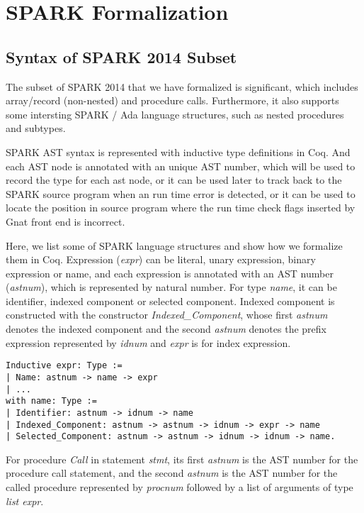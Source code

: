 \section{SPARK Formalization}
\subsection{Syntax of SPARK 2014 Subset}
The subset of SPARK 2014 that we have formalized is significant, which includes
array/record (non-nested) and procedure calls. Furthermore, it also supports
some intersting SPARK / Ada language structures, such as nested procedures and
subtypes.

SPARK AST syntax is represented with inductive type definitions in Coq. And each
AST node is annotated with an unique AST number, which will be used to record
the type for each ast node, or it can be used later to track back to the
SPARK source program when an run time error is detected, or it can be used to
locate the position in source program where the run time check flags inserted by
Gnat front end is incorrect.

Here, we list some of SPARK language structures and show how we formalize them
in Coq. Expression (\textit{expr}) can be literal, unary expression, binary
expression or name, and each expression is annotated with an AST number
(\textit{astnum}), which is represented by natural number. For type
\textit{name}, it can be identifier, indexed component or selected component.
Indexed component is constructed with the constructor
\textit{Indexed\_Component}, whose first \textit{astnum} denotes the indexed
component and the second \textit{astnum} denotes the prefix expression
represented by \textit{idnum} and \textit{expr} is for index expression. 

\begin{lstlisting}[escapechar=\#, language=coq, basicstyle=\small]
Inductive expr: Type := 
| Name: astnum -> name -> expr 
| ...
with name: Type := 
| Identifier: astnum -> idnum -> name 
| Indexed_Component: astnum -> astnum -> idnum -> expr -> name 
| Selected_Component: astnum -> astnum -> idnum -> idnum -> name.
\end{lstlisting}

For procedure \textit{Call} in statement \textit{stmt}, its first
\textit{astnum} is the AST number for the procedure call statement, and the
second \textit{astnum} is the AST number for the called procedure represented by 
\textit{procnum} followed by a list of arguments of type \textit{list expr}.

